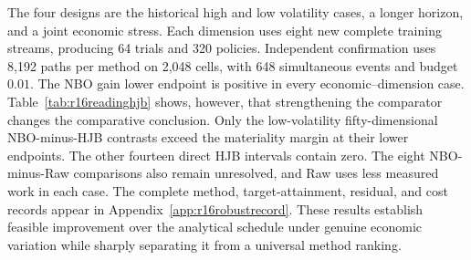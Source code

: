 The four designs are the historical high and low volatility cases, a longer horizon, and a joint economic stress. Each dimension uses eight new complete training streams, producing 64 trials and 320 policies. Independent confirmation uses 8,192 paths per method on 2,048 cells, with 648 simultaneous events and budget $0.01$. The NBO gain lower endpoint is positive in every economic--dimension case. Table~\ref{tab:r16readinghjb} shows, however, that strengthening the comparator changes the comparative conclusion. Only the low-volatility fifty-dimensional NBO-minus-HJB contrasts exceed the materiality margin at their lower endpoints. The other fourteen direct HJB intervals contain zero. The eight NBO-minus-Raw comparisons also remain unresolved, and Raw uses less measured work in each case. The complete method, target-attainment, residual, and cost records appear in Appendix~\ref{app:r16robustrecord}. These results establish feasible improvement over the analytical schedule under genuine economic variation while sharply separating it from a universal method ranking.


